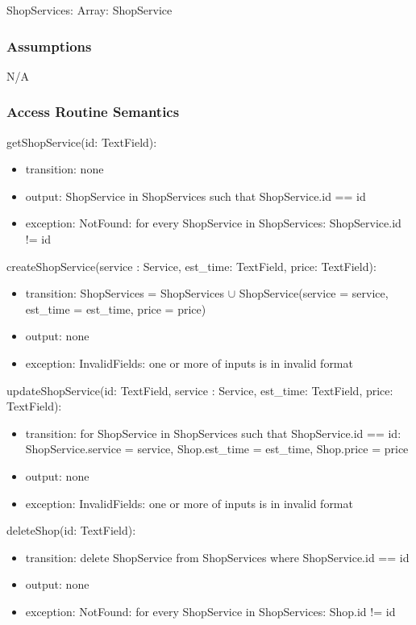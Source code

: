 \documentclass[12pt, titlepage]{article}
\begin{document}
ShopServices: Array: ShopService

\subsubsection{Assumptions}

N/A

\subsubsection{Access Routine Semantics}

\noindent getShopService(id: TextField):
\begin{itemize}
    \item transition: none
    \item output: ShopService in ShopServices such that ShopService.id == id
    \item exception: NotFound: for every ShopService in ShopServices: ShopService.id != id
\end{itemize}

\noindent createShopService(service : Service, est\_time: TextField, price: TextField):
\begin{itemize}
    \item transition: ShopServices = ShopServices $\cup$ ShopService(service = service, est\_time = est\_time, price = price)
    \item output: none
    \item exception: InvalidFields: one or more of inputs is
    in invalid format
\end{itemize}

\noindent updateShopService(id: TextField, service : Service, est\_time: TextField, price: TextField):
\begin{itemize}
    \item transition: for ShopService in ShopServices such that ShopService.id == id: ShopService.service = service, Shop.est\_time = est\_time, Shop.price = price
    \item output: none
    \item exception: InvalidFields: one or more of inputs is in invalid format
\end{itemize}

\noindent deleteShop(id: TextField):
\begin{itemize}
    \item transition: delete ShopService from ShopServices where ShopService.id == id
    \item output: none
    \item exception: NotFound: for every ShopService in ShopServices: Shop.id != id
\end{itemize}
\end{document}

